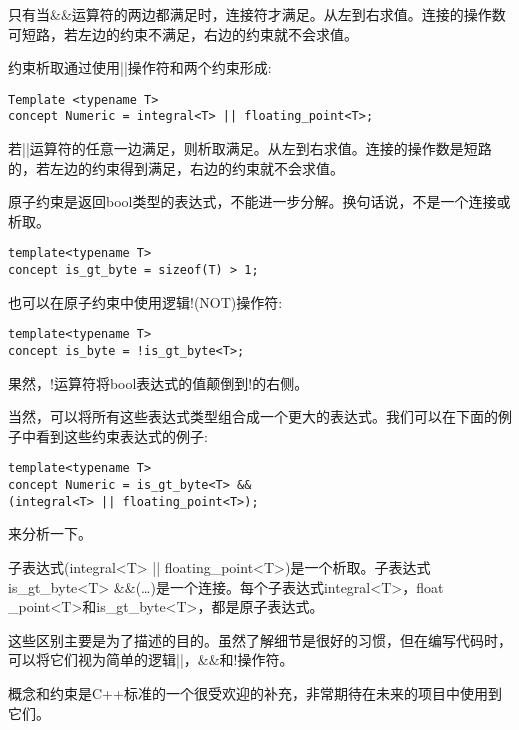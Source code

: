 只有当\&\&运算符的两边都满足时，连接符才满足。从左到右求值。连接的操作数可短路，若左边的约束不满足，右边的约束就不会求值。

约束析取通过使用||操作符和两个约束形成:

\begin{lstlisting}[style=styleCXX]
Template <typename T>
concept Numeric = integral<T> || floating_point<T>;
\end{lstlisting}

若||运算符的任意一边满足，则析取满足。从左到右求值。连接的操作数是短路的，若左边的约束得到满足，右边的约束就不会求值。

原子约束是返回bool类型的表达式，不能进一步分解。换句话说，不是一个连接或析取。

\begin{lstlisting}[style=styleCXX]
template<typename T>
concept is_gt_byte = sizeof(T) > 1;
\end{lstlisting}

也可以在原子约束中使用逻辑!(NOT)操作符:

\begin{lstlisting}[style=styleCXX]
template<typename T>
concept is_byte = !is_gt_byte<T>;
\end{lstlisting}

果然，!运算符将bool表达式的值颠倒到!的右侧。

当然，可以将所有这些表达式类型组合成一个更大的表达式。我们可以在下面的例子中看到这些约束表达式的例子:

\begin{lstlisting}[style=styleCXX]
template<typename T>
concept Numeric = is_gt_byte<T> &&
(integral<T> || floating_point<T>);
\end{lstlisting}

来分析一下。

子表达式(integral<T> || floating\_point<T>)是一个析取。子表达式is\_gt\_byte<T> \&\&(…)是一个连接。每个子表达式integral<T>，float \_point<T>和is\_gt\_byte<T>，都是原子表达式。

这些区别主要是为了描述的目的。虽然了解细节是很好的习惯，但在编写代码时，可以将它们视为简单的逻辑||，\&\&和!操作符。

概念和约束是C++标准的一个很受欢迎的补充，非常期待在未来的项目中使用到它们。







